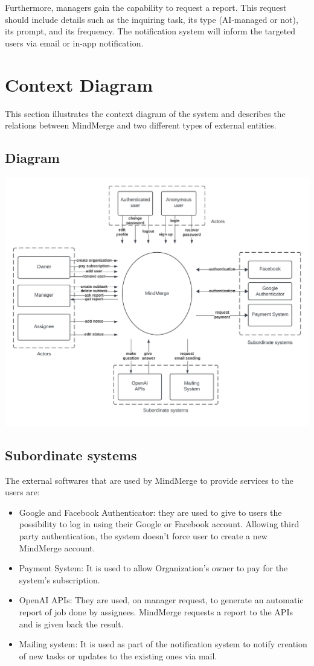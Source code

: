 \documentclass{article}
\begin{document}
Furthermore, managers gain the capability to request a report. This request should include details such as the inquiring task, its type (AI-managed or not), its prompt, and its frequency. The notification system will inform the targeted users via email or in-app notification.

\section{Context Diagram}
This section illustrates the context diagram of the system and describes the relations between MindMerge and two different types of external entities.

\subsection{Diagram}
\includegraphics[width=\textwidth, height=\textheight, keepaspectratio]{images/context_diagram.jpeg}

\subsection{Subordinate systems}
The external softwares that are used by MindMerge to provide services to the users are:
\begin{itemize}
    \item Google and Facebook Authenticator: they are used to give to users the possibility to log in using their Google or Facebook account. Allowing third party authentication, the system doesn't force user to create a new MindMerge account.
    \item Payment System: It is used to allow Organization's owner to pay for the system's subscription.
    \item OpenAI APIs: They are used, on manager request, to generate an automatic report of job done by assignees. MindMerge requests a report to the APIs and is given back the result.
    \item Mailing system: It is used as part of the notification system to notify creation of new tasks or updates to the existing ones via mail.
\end{itemize}
\end{document}
